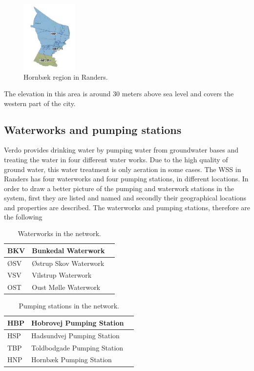 \begin{figure}[H]
\centering
\includegraphics[width=0.25\textwidth]{report/pictures/Hornbaek_region}
\caption{Hornbæk region in Randers.}
\label{fig:hornbaek_region}
\end{figure}

The elevation in this area is around 30 meters above sea level and covers the western part of the city.  

\subsection{Waterworks and pumping stations}
\label{waterworks_and_pumping_stations}

Verdo provides drinking water by pumping water from groundwater bases and treating the water in four different water works. Due to the high quality of ground water, this water treatment is only aeration in some cases. The WSS in Randers has four waterworks and four pumping stations, in different locations. In order to draw a better picture of the pumping and waterwork stations in the system, first they are listed and named and secondly their geographical locations and properties are described. The waterworks and pumping stations, therefore are the following

\begin{table}[H]
\begin{center}
    \begin{tabular}{| l | l | l |}
    \hline
    BKV & Bunkedal Waterwork   \\ \hline
    ØSV & Østrup Skov Waterwork  \\ \hline
    VSV & Vilstrup Waterwork  \\ \hline
    OST & Oust Mølle Waterwork   \\
    \hline
    \end{tabular}
\end{center}
\caption{Waterworks in the network.}
\end{table}

\begin{table}[H]
\begin{center}
    \begin{tabular}{| l | l | l |}
    \hline
    HBP & Hobrovej Pumping Station   \\ \hline
    HSP & Hadsundvej Pumping Station  \\ \hline
    TBP & Toldbodgade Pumping Station  \\ \hline
    HNP & Hornbæk Pumping Station   \\
    \hline
    \end{tabular}
\end{center}
\caption{Pumping stations in the network.}
\end{table}

